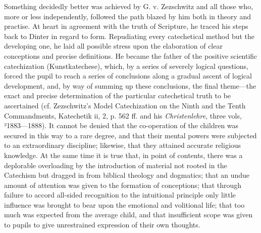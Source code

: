 Something decidedly better was achieved by G. v. Zezschwitz and all those who, more or less independently, followed the path blazed by him both in theory and practise. At heart in agreement with the truth of Scripture, he traced his steps back to Dinter in regard to form. Repudiating every catechetical method but the developing one, he laid all possible stress upon the elaboration of clear conceptions and precise definitions. He became the father of the positive scientific catechization (Kunstkatechese), which, by a series of severely logical questions, forced the pupil to reach a series of conclusions along a gradual ascent of logical development, and,
by way of summing up these conclusions, the final theme—the exact and precise determination of the particular catechetical truth to be ascertained (cf. Zezschwitz’s Model Catechization on the Ninth and the Tenth Commandments, Katechetik ii, 2, p. 562 ff. and his \emph{Christenlehre}, three vols, ²1883—1888). It cannot be denied that the co-operation of the children was secured in this way to a rare degree, and that their mental powers were subjected to an extraordinary discipline; likewise, that they attained accurate religious knowledge. At the same time it is true that, in point of contents, there was a deplorable overloading by the introduction of material not rooted in the Catechism but dragged in from biblical theology and dogmatics; that an undue amount of attention was given to the formation of conceptions; that through failure to accord all-sided recognition to the intuitional principle only little influence was brought to bear upon the emotional and volitional life; that too much was expected from the average child, and that insufficient scope was given to pupils to give unrestrained expression of their own thoughts.

